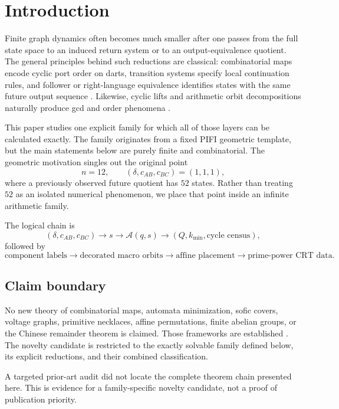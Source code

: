 \documentclass[11pt,a4paper]{article}
\theoremstyle{definition}
\providecommand{\A}{}
\renewcommand{\A}{\mathcal A}
\begin{document}
\section{Introduction}

Finite graph dynamics often becomes much smaller after one passes from the full state space to an induced return system or to an output-equivalence quotient.
The general principles behind such reductions are classical: combinatorial maps encode cyclic port order on darts, transition systems specify local continuation rules, and follower or right-language equivalence identifies states with the same future output sequence
\cite{Moore1956,LindMarcus2021,Johansen2011}.
Likewise, cyclic lifts and arithmetic orbit decompositions naturally produce gcd and order phenomena
\cite{GrossTucker1977,HubardMochanMontero2023}.

This paper studies one explicit family for which all of those layers can be calculated exactly.
The family originates from a fixed PIFI geometric template, but the main statements below are purely finite and combinatorial.
The geometric motivation singles out the original point
\[
n=12,\qquad
(\delta,c_{AB},c_{BC})=(1,1,1),
\]
where a previously observed future quotient has \(52\) states.
Rather than treating \(52\) as an isolated numerical phenomenon, we place that point inside an infinite arithmetic family.

The logical chain is
\[
(\delta,c_{AB},c_{BC})
\longrightarrow
s
\longrightarrow
\A(q,s)
\longrightarrow
(Q,k_{\min},\text{cycle census}),
\]
followed by
\[
\text{component labels}
\longrightarrow
\text{decorated macro orbits}
\longrightarrow
\text{affine placement}
\longrightarrow
\text{prime-power CRT data}.
\]

\subsection{Claim boundary}

No new theory of combinatorial maps, automata minimization, sofic covers, voltage graphs, primitive necklaces, affine permutations, finite abelian groups, or the Chinese remainder theorem is claimed.
Those frameworks are established
\cite{LindMarcus2021,Johansen2011,GrossTucker1977,HubardMochanMontero2023,BorsWang2022,DuttaPrasad2011,Cao2011}.
The novelty candidate is restricted to the exactly solvable family defined below, its explicit reductions, and their combined classification.

A targeted prior-art audit did not locate the complete theorem chain presented here.
This is evidence for a family-specific novelty candidate, not a proof of publication priority.
\end{document}
